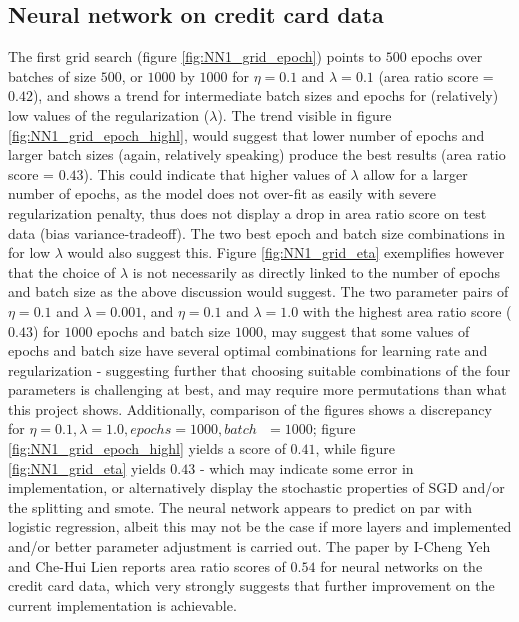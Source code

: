 \documentclass[%
oneside,                 %
final,                   %
10pt]{article}
\begin{document}
\subsection{Neural network on credit card data}
The first grid search (figure \ref{fig:NN1_grid_epoch}) points to $500$ epochs over batches of size $500$, or $1000$ by $1000$ for $\eta=0.1$ and $\lambda=0.1$ (area ratio score = $0.42$), and shows a trend for intermediate batch sizes and epochs for (relatively) low values of the regularization ($\lambda$). The trend visible in  figure \ref{fig:NN1_grid_epoch_highl}, would suggest that lower number of epochs and larger batch sizes (again, relatively speaking) produce the best results (area ratio score = $0.43$). This could indicate that higher values of $\lambda$ allow for a larger number of epochs, as the model does not over-fit as easily with severe regularization penalty, thus does not display a drop in area ratio score on test data (bias variance-tradeoff). The two best epoch and batch size combinations in for low $\lambda$ would also suggest this. Figure \ref{fig:NN1_grid_eta} exemplifies however that the choice of $\lambda$ is not necessarily as directly linked to the number of epochs and batch size as the above discussion would suggest. The two parameter pairs of $\eta=0.1$ and $\lambda=0.001$, and $\eta=0.1$ and $\lambda=1.0$ with the highest area ratio score ($0.43$) for $1000$ epochs and batch size $1000$, may suggest that some values of epochs and batch size have several optimal combinations for learning rate and regularization - suggesting further that choosing suitable combinations of the four parameters is challenging at best, and may require more permutations than what this project shows. Additionally, comparison of the figures shows a discrepancy for $\eta=0.1,\lambda=1.0,epochs=1000,batch \textit{ }=1000$; figure \ref{fig:NN1_grid_epoch_highl} yields a score of $0.41$, while  figure \ref{fig:NN1_grid_eta} yields $0.43$ - which may indicate some error in implementation, or alternatively display the stochastic properties of SGD and/or the splitting and smote. The neural network appears to predict on par with logistic regression, albeit this may not be the case if more layers and implemented and/or better parameter adjustment is carried out. The paper by  I-Cheng Yeh and Che-Hui Lien \cite{YCCC} reports area ratio scores of $0.54$ for neural networks on the credit card data, which very strongly suggests that further improvement on the current implementation is achievable. 
\end{document}
